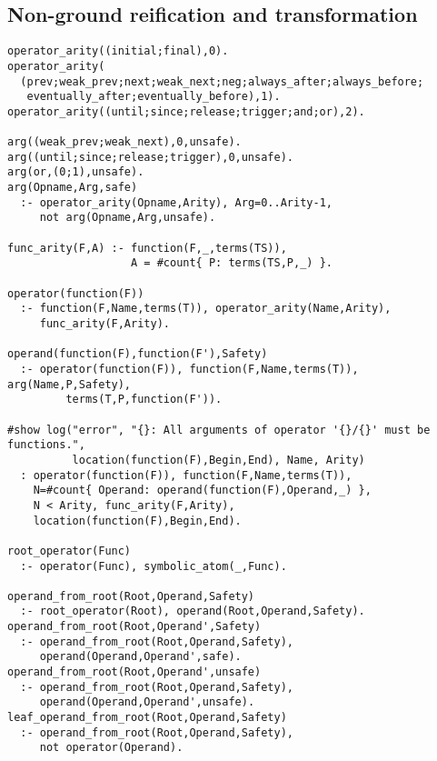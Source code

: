 \subsection{Non-ground reification and transformation}


\begin{center}
\begin{minipage}{\linewidth}
  \begin{lstlisting}[]
operator_arity((initial;final),0).
operator_arity(
  (prev;weak_prev;next;weak_next;neg;always_after;always_before;
   eventually_after;eventually_before),1).
operator_arity((until;since;release;trigger;and;or),2).

arg((weak_prev;weak_next),0,unsafe).
arg((until;since;release;trigger),0,unsafe).
arg(or,(0;1),unsafe).
arg(Opname,Arg,safe)
  :- operator_arity(Opname,Arity), Arg=0..Arity-1, 
     not arg(Opname,Arg,unsafe).

func_arity(F,A) :- function(F,_,terms(TS)), 
                   A = #count{ P: terms(TS,P,_) }.

operator(function(F))
  :- function(F,Name,terms(T)), operator_arity(Name,Arity), 
     func_arity(F,Arity).

operand(function(F),function(F'),Safety)
  :- operator(function(F)), function(F,Name,terms(T)), arg(Name,P,Safety),
		 terms(T,P,function(F')).

#show log("error", "{}: All arguments of operator '{}/{}' must be functions.", 
          location(function(F),Begin,End), Name, Arity)
  : operator(function(F)), function(F,Name,terms(T)), 
    N=#count{ Operand: operand(function(F),Operand,_) },
    N < Arity, func_arity(F,Arity), 
    location(function(F),Begin,End).

root_operator(Func)
  :- operator(Func), symbolic_atom(_,Func).

operand_from_root(Root,Operand,Safety)
  :- root_operator(Root), operand(Root,Operand,Safety).
operand_from_root(Root,Operand',Safety)
  :- operand_from_root(Root,Operand,Safety), 
     operand(Operand,Operand',safe).
operand_from_root(Root,Operand',unsafe)
  :- operand_from_root(Root,Operand,Safety), 
     operand(Operand,Operand',unsafe).
leaf_operand_from_root(Root,Operand,Safety)
  :- operand_from_root(Root,Operand,Safety), 
     not operator(Operand).

\end{lstlisting}
\end{minipage}
\end{center}


